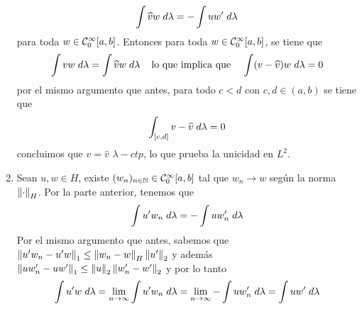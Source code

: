 \documentclass{article}
\begin{document}
\begin{enumerate}
\begin{equation*}
        \int \widehat{v}w\hspace{1mm}d\lambda=-\int uw'\hspace{1mm}d\lambda
    \end{equation*}
    para toda $w\in\mathcal{C}_{0}^{\infty}[a,b]$. Entonces para toda $w\in\mathcal{C}_{0}^{\infty}[a,b]$, se 
    tiene que
    \begin{equation*}
        \int vw\hspace{1mm}d\lambda=\int\widehat{v}w\hspace{1mm}d\lambda
        \hspace{4mm}\text{lo que implica que}\hspace{4mm}
        \int(v-\widehat{v})w\hspace{1mm}d\lambda=0
    \end{equation*}
    por el mismo argumento que antes, para todo $c<d$ con $c,d\in(a,b)$ se tiene que
    \begin{equation*}
        \int_{[c,d]}v-\widehat{v}\hspace{1mm}d\lambda=0
    \end{equation*}
    concluimos que $v=\widehat{v}$ $\lambda-ctp$, lo que prueba la unicidad en $L^{2}$.
    
    \item Sean $u,w\in H$, existe $(w_{n})_{n\in\mathbb{N}}\in\mathcal{C}_{0}^{\infty}[a,b]$ tal que $w_{n}\to w$ 
    según la norma $\left \lVert \cdot\right \rVert_{H}$. Por la parte anterior, tenemos que
    \begin{equation*}
        \int u'w_{n}\hspace{1mm}d\lambda=-\int uw_{n}'\hspace{1mm}d\lambda
    \end{equation*}
    Por el mismo argumento que antes, sabemos que $\left \lVert u'w_{n}-u'w\right \rVert_{1}\leq\left \lVert w_{n}-w\right \rVert_{H}
    \left \lVert u'\right \rVert_{2}$ y además $\left \lVert uw_{n}'-uw'\right \rVert_{1}\leq\left \lVert u\right \rVert_{2}\left \lVert w_{n}'-w'\right \rVert_{2}$ y por lo 
    tanto
    \begin{equation*}
        \int u'w\hspace{1mm}d\lambda=\lim\limits_{n\to\infty}\int u'w_{n}\hspace{1mm}d\lambda
        =\lim\limits_{n\to\infty}-\int uw_{n}'\hspace{1mm}d\lambda=\int uw'\hspace{1mm}d\lambda
    \end{equation*}
    

\end{enumerate}
\end{document}
